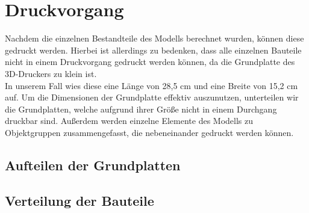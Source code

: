 \section{Druckvorgang}
Nachdem die einzelnen Bestandteile des Modells berechnet wurden, können diese gedruckt werden.
Hierbei ist allerdings zu bedenken, dass alle einzelnen Bauteile nicht in einem Druckvorgang gedruckt werden können, da die Grundplatte des 3D-Druckers zu klein ist. \\
In unserem Fall wies diese eine Länge von 28,5 cm und eine Breite von 15,2 cm auf.
Um die Dimensionen der Grundplatte effektiv auszunutzen, unterteilen wir die Grundplatten, welche aufgrund ihrer Größe nicht in einem Durchgang druckbar sind.
Außerdem werden einzelne Elemente des Modells zu Objektgruppen zusammengefasst, die nebeneinander gedruckt werden können.

\subsection{Aufteilen der Grundplatten}

\subsection{Verteilung der Bauteile}
